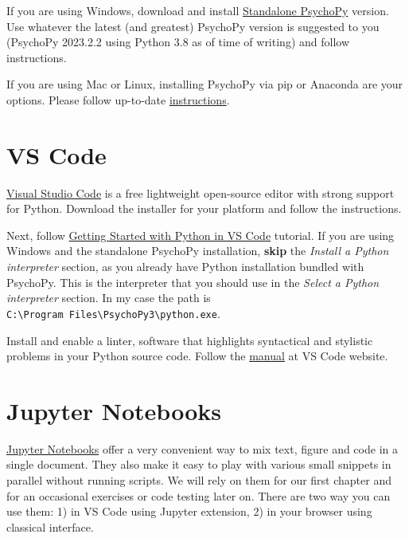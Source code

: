 \documentclass[
]{book}
\begin{document}
If you are using Windows, download and install \href{https://www.psychopy.org/download.html}{Standalone PsychoPy} version. Use whatever the latest (and greatest) PsychoPy version is suggested to you (PsychoPy 2023.2.2 using Python 3.8 as of time of writing) and follow instructions.

If you are using Mac or Linux, installing PsychoPy via pip or Anaconda are your options. Please follow up-to-date \href{https://www.psychopy.org/download.html\#manual-installations}{instructions}.

\hypertarget{install-vs-code}{%
\section{VS Code}\label{install-vs-code}}

\href{https://code.visualstudio.com/}{Visual Studio Code} is a free lightweight open-source editor with strong support for Python. Download the installer for your platform and follow the instructions.

Next, follow \href{https://code.visualstudio.com/docs/python/python-tutorial}{Getting Started with Python in VS Code} tutorial. If you are using Windows and the standalone PsychoPy installation, \textbf{skip} the \emph{Install a Python interpreter} section, as you already have Python installation bundled with PsychoPy. This is the interpreter that you should use in the \emph{Select a Python interpreter} section. In my case the path is \texttt{C:\textbackslash{}Program\ Files\textbackslash{}PsychoPy3\textbackslash{}python.exe}.

Install and enable a linter, software that highlights syntactical and stylistic problems in your Python source code. Follow the \href{https://code.visualstudio.com/docs/python/linting}{manual} at VS Code website.

\hypertarget{jupyter-notebooks}{%
\section{Jupyter Notebooks}\label{jupyter-notebooks}}

\href{https://jupyter.org/}{Jupyter Notebooks} offer a very convenient way to mix text, figure and code in a single document. They also make it easy to play with various small snippets in parallel without running scripts. We will rely on them for our first chapter and for an occasional exercises or code testing later on. There are two way you can use them: 1) in VS Code using Jupyter extension, 2) in your browser using classical interface.
\end{document}

